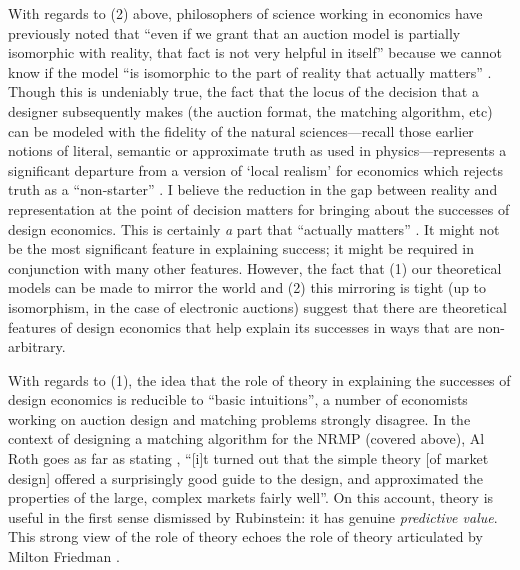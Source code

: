 With regards to (2) above, philosophers of science working in economics have previously noted that ``even if we grant that an auction model is partially isomorphic with reality, that fact is not very helpful in itself'' because we cannot know if the model ``is isomorphic to the part of reality that actually matters'' \autocite[309]{alexandrova2009}. Though this is undeniably true, the fact that the locus of the decision that a designer subsequently makes (the auction format, the matching algorithm, etc) can be modeled with the fidelity of the natural sciences---recall those earlier notions of literal, semantic or approximate truth as used in physics---represents a significant departure from a version of `local realism' for economics which rejects truth as a ``non-starter'' \autocite[above]{alexandrova2009}. I believe the reduction in the gap between reality and representation at the point of decision matters for bringing about the successes of design economics. This is certainly \textit{a} part that ``actually matters'' \autocite[above]{alexandrova2009}. It might not be the most significant feature in explaining success; it might be required in conjunction with many other features. However, the fact that (1) our theoretical models can be made to mirror the world and (2) this mirroring is tight (up to isomorphism, in the case of electronic auctions) suggest that there are theoretical features of design economics that help explain its successes in ways that are non-arbitrary.

With regards to (1), the idea that the role of theory in explaining the successes of design economics is reducible to ``basic intuitions'', a number of economists working on auction design and matching problems strongly disagree. In the context of designing a matching algorithm for the NRMP (covered above), Al Roth goes as far as stating \autocite[1372]{roth2002}, ``[i]t turned out that the simple theory [of market design] offered a surprisingly good guide to the design, and approximated the properties of the large, complex markets fairly well''. On this account, theory is useful in the first sense dismissed by Rubinstein: it has genuine \textit{predictive value}. This strong view of the role of theory echoes the role of theory articulated by Milton Friedman \autocite*{friedman1953}. 

